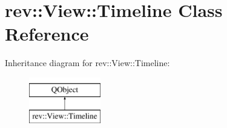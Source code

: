 \hypertarget{classrev_1_1_view_1_1_timeline}{}\section{rev\+::View\+::Timeline Class Reference}
\label{classrev_1_1_view_1_1_timeline}
Inheritance diagram for rev\+::View\+::Timeline\+:\begin{figure}[H]
\begin{center}
\leavevmode
\includegraphics[height=2.000000cm]{classrev_1_1_view_1_1_timeline}
\end{center}
\end{figure}
